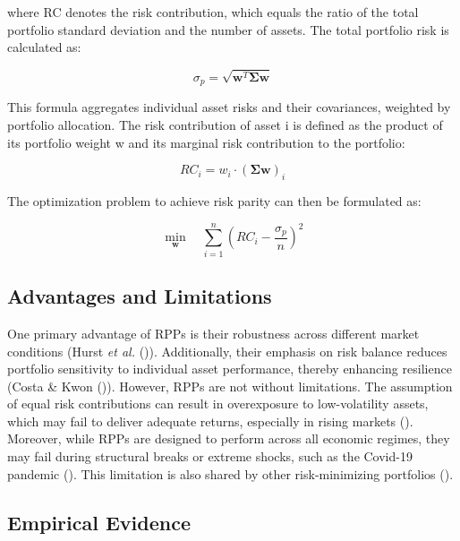 \documentclass[11pt,preprint]{elsarticle}
\numberwithin{equation}{section}
\numberwithin{figure}{section}
\numberwithin{table}{section}
\begin{document}
where RC denotes the risk contribution, which equals the ratio of the
total portfolio standard deviation and the number of assets. The total
portfolio risk is calculated as:

\begin{equation}
\sigma_p = \sqrt{\mathbf{w}^T \boldsymbol{\Sigma} \mathbf{w}}
\end{equation}

This formula aggregates individual asset risks and their covariances,
weighted by portfolio allocation. The risk contribution of asset i is
defined as the product of its portfolio weight w and its marginal risk
contribution to the portfolio:

\begin{equation}
RC_i = w_i \cdot (\boldsymbol{\Sigma} \mathbf{w})_i 
\end{equation}

The optimization problem to achieve risk parity can then be formulated
as:

\begin{equation}
\min_{\mathbf{w}}  \quad \sum_{i=1}^n \left( RC_i - \frac{\sigma_p}{n} \right)^2 
\end{equation}

\subsection{Advantages and
Limitations}\label{advantages-and-limitations}

One primary advantage of RPPs is their robustness across different
market conditions (Hurst \emph{et al.}
()). Additionally, their
emphasis on risk balance reduces portfolio sensitivity to individual
asset performance, thereby enhancing resilience (Costa \& Kwon
()). However, RPPs are not without
limitations. The assumption of equal risk contributions can result in
overexposure to low-volatility assets, which may fail to deliver
adequate returns, especially in rising markets
().
Moreover, while RPPs are designed to perform across all economic
regimes, they may fail during structural breaks or extreme shocks, such
as the Covid-19 pandemic (). This limitation is also shared by other risk-minimizing
portfolios ().

\subsection{Empirical Evidence}\label{empirical-evidence}
\end{document}
